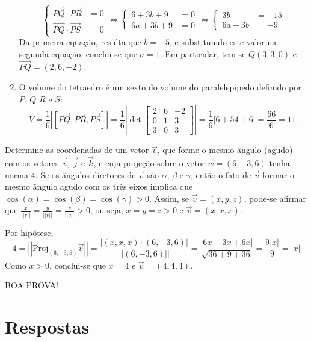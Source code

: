 \documentclass[12pt,a4paper]{article}
\newcommand{\vect}[1]{\overrightarrow{#1}}
\newcommand{\norm}[1]{\left|\left|{#1}\right|\right|}
\begin{document}
\begin{ExerciseList}
\begin{enumerate}
\[
\begin{cases}
\vect{PQ} \cdot \vect{PR} & = 0\\
\vect{PQ} \cdot \vect{PS} & =0
\end{cases}
\Leftrightarrow
\begin{cases}
6 + 3b + 9 & = 0\\
6a + 3b + 9 & = 0
\end{cases}
\Leftrightarrow
\begin{cases}
3b & = -15\\
6a + 3b & = -9
\end{cases}
\]
Da primeira equação, resulta que $b = -5$, e substituindo este valor na segunda equação, conclui-se que $a = 1$. Em particular, tem-se $Q(3,3,0)$ e $\vect{PQ} = (2,6,-2)$.
\item O volume do tetraedro é um sexto do volume do paralelepípedo definido por $P$, $Q$ $R$ e $S$:
\[
V
= \frac{1}{6}
\left| [ \vect{PQ}, \vect{PR}, \vect{PS}] \right|
= \frac{1}{6} 
\left|\det
\begin{bmatrix}
2 & 6 & -2\\
0 & 1 &  3\\
3 & 0 &  3
\end{bmatrix}
\right|
=\frac{1}{6}| 6+54+6|
=\frac{66}{6}
=11
.
\]
\end{enumerate} 

\Exercise[title={2,5}] Determine as coordenadas de um vetor $\vec{v}$, que forme o mesmo ângulo (agudo) com os vetores $\vec{i}$, $\vec{j}$ e $\vec{k}$, e cuja projeção sobre o vetor $\vec{w} = (6,-3,6)$ tenha norma $4$.
\Answer Se os ângulos diretores de $\vec{v}$ são $\alpha$, $\beta$ e $\gamma$, então o fato de $\vec{v}$ formar o mesmo ângulo agudo com os três eixos implica que $\cos(\alpha) = \cos(\beta) = \cos(\gamma) > 0$. Assim, se $\vec{v} = (x,y,z)$, pode-se afirmar que $\frac{x}{\norm{v}} = \frac{y}{\norm{v}} = \frac{z}{\norm{v}} > 0$, ou seja, $x=y=z > 0$ e $\vec{v} = (x,x,x)$.

Por hipótese,
\[
4 = \norm{\text{Proj}_{(6,-3,6)} \vec{v}}
= \frac{ | (x,x,x) \cdot (6,-3,6) | }{ \norm{(6,-3,6)} }
= \frac{ |6x -3x + 6x| }{ \sqrt{ 36 + 9 + 36} }
= \frac{ 9|x| }{ 9 }
= |x|
\]
Como $x > 0$, conclui-se que $x = 4$ e $\vec{v} = (4,4,4)$.

\end{ExerciseList}

\begin{center}
BOA PROVA!
\end{center}

\newpage
\restoregeometry
\section*{Respostas}
\shipoutAnswer
\end{document}
